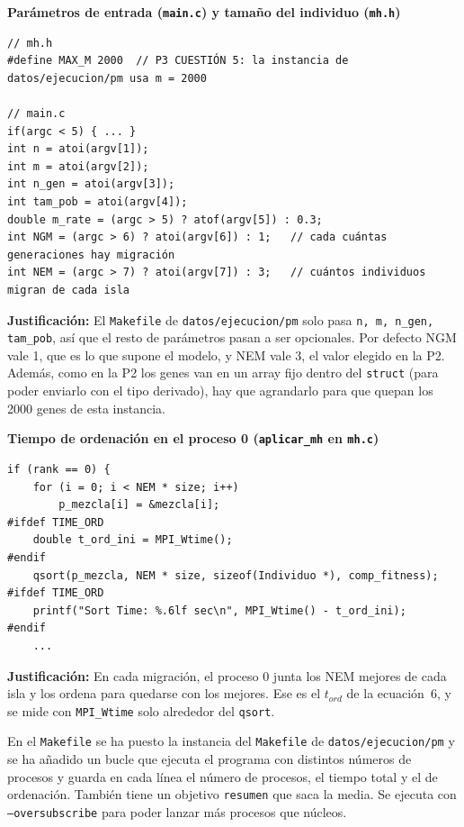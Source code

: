 \documentclass[12pt]{article}
\begin{document}
\begin{enumerate}
\medskip
\noindent\textbf{Parámetros de entrada (\texttt{main.c}) y tamaño del individuo (\texttt{mh.h})}\par
\smallskip

\begin{lstlisting}[style=EstiloC]
// mh.h
#define MAX_M 2000  // P3 CUESTIÓN 5: la instancia de datos/ejecucion/pm usa m = 2000

// main.c
if(argc < 5) { ... }
int n = atoi(argv[1]);
int m = atoi(argv[2]);
int n_gen = atoi(argv[3]);
int tam_pob = atoi(argv[4]);
double m_rate = (argc > 5) ? atof(argv[5]) : 0.3;
int NGM = (argc > 6) ? atoi(argv[6]) : 1;   // cada cuántas generaciones hay migración
int NEM = (argc > 7) ? atoi(argv[7]) : 3;   // cuántos individuos migran de cada isla
\end{lstlisting}

\textbf{Justificación:} El \texttt{Makefile} de \texttt{datos/ejecucion/pm} solo pasa \texttt{n, m, n\_gen, tam\_pob}, así que el resto de parámetros pasan a ser opcionales. Por defecto NGM vale 1, que es lo que supone el modelo, y NEM vale 3, el valor elegido en la P2. Además, como en la P2 los genes van en un array fijo dentro del \texttt{struct} (para poder enviarlo con el tipo derivado), hay que agrandarlo para que quepan los 2000 genes de esta instancia.

\vspace{0.5cm}

\medskip
\noindent\textbf{Tiempo de ordenación en el proceso 0 (\texttt{aplicar\_mh} en \texttt{mh.c})}\par
\smallskip

\begin{lstlisting}[style=EstiloC]
if (rank == 0) {
	for (i = 0; i < NEM * size; i++)
		p_mezcla[i] = &mezcla[i];
#ifdef TIME_ORD
	double t_ord_ini = MPI_Wtime();
#endif
	qsort(p_mezcla, NEM * size, sizeof(Individuo *), comp_fitness);
#ifdef TIME_ORD
	printf("Sort Time: %.6lf sec\n", MPI_Wtime() - t_ord_ini);
#endif
	...
\end{lstlisting}

\textbf{Justificación:} En cada migración, el proceso 0 junta los NEM mejores de cada isla y los ordena para quedarse con los mejores. Ese es el $t_{ord}$ de la ecuación~6, y se mide con \texttt{MPI\_Wtime} solo alrededor del \texttt{qsort}.

\vspace{0.5cm}

En el \texttt{Makefile} se ha puesto la instancia del \texttt{Makefile} de \texttt{datos/ejecucion/pm} y se ha añadido un bucle que ejecuta el programa con distintos números de procesos y guarda en cada línea el número de procesos, el tiempo total y el de ordenación. También tiene un objetivo \texttt{resumen} que saca la media. Se ejecuta con \texttt{--oversubscribe} para poder lanzar más procesos que núcleos.


\end{enumerate}
\end{document}

